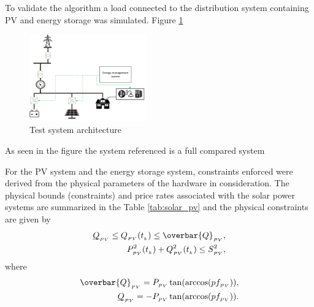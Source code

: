 \label{sec:experimental_setup}
To validate the algorithm a load connected to the distribution system containing PV and energy storage was simulated. Figure \ref{fig:system_arch}

\begin{figure}[!htbp]
\centering
\includegraphics[width=0.45\textwidth]{figs/System_architecture.png}
\caption{Test system architecture}
\label{fig:system_arch}
\vspace{-3mm}
\end{figure}

As seen in the figure the system referenced is a full compared system

For the PV system and the energy storage system, constraints enforced were derived from the physical parameters of the hardware in consideration. The physical bounds (constraints) and price rates associated with the solar power systems are summarized in the Table \ref{tab:solar_pv} and the physical constraints are given by
\vspace{-2mm}
\begin{eqnarray}
\underbar{$Q$}_{_{PV}}\leq Q_{_{PV}}(t_{_k}) \leq \overbar{Q}_{_{PV}}, \\
P^2_{_{PV}}(t_{_k})+Q^2_{_{PV}}(t_{_k})\leq S^2_{_{PV}},
\end{eqnarray}
where
\begin{eqnarray}
\overbar{Q}_{_{PV}}= P_{_{PV}}\tan(\arccos(pf_{_{PV}})),\\
\underbar{$Q$}_{_{PV}}= -P_{_{PV}}\tan(\arccos(pf_{_{PV}})).
\end{eqnarray}


